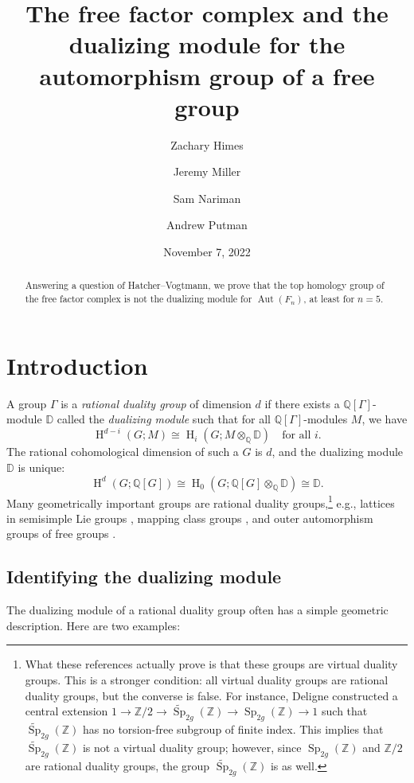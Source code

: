 \documentclass[11pt]{amsart}
\title[Free factors and dualizing modules]{The free factor complex and the dualizing module for the automorphism group of a free group}
\author{Zachary Himes}
\author{Jeremy Miller}
\author{Sam Nariman}
\author{Andrew Putman}
\date{November 7, 2022}
\numberwithin{equation}{section}
\theoremstyle{plain}
\theoremstyle{definition}
\theoremstyle{remark}
\DeclareMathOperator{\Sp}{Sp}
\newcommand\Z{\ensuremath{\mathbb{Z}}}
\newcommand\Q{\ensuremath{\mathbb{Q}}}
\DeclareMathOperator{\HH}{H}
\DeclareMathOperator{\Aut}{Aut}
\newcommand\bbD{\ensuremath{\mathbb{D}}}
\begin{document}
\newpage

\begin{abstract}
Answering a question of Hatcher--Vogtmann, we prove that the top homology group of the free factor complex is not the dualizing module
for $\Aut(F_n)$, at least for $n = 5$.
\end{abstract}

\maketitle

\section{Introduction}
\label{section:introduction}

A group $\Gamma$ is a {\em rational duality group} of dimension $d$ if there exists a $\Q[\Gamma]$-module $\bbD$ called the
{\em dualizing module} such that for all $\Q[\Gamma]$-modules $M$, we have
\[\HH^{d-i}(G;M) \cong \HH_{i}(G;M \otimes_{\Q} \bbD) \quad \text{for all $i$}.\]
The rational cohomological dimension of such a $G$ is $d$, and the dualizing module $\bbD$ is unique:
\[\HH^d(G;\Q[G]) \cong \HH_0(G;\Q[G] \otimes_{\Q} \bbD) \cong \bbD.\]
Many geometrically important groups are rational duality groups,\footnote{What these references actually prove
is that these groups are virtual duality groups.  This is a stronger condition: all virtual duality groups
are rational duality groups, but the converse is false.  For instance, Deligne \cite{DeligneRF} constructed a
central extension $1 \rightarrow \mathbb{Z}/2 \rightarrow \widetilde{\Sp}_{2g}(\Z) \rightarrow \Sp_{2g}(\Z) \rightarrow 1$
such that $\widetilde{\Sp}_{2g}(\Z)$ has no torsion-free subgroup of finite index.  This implies that
$\widetilde{\Sp}_{2g}(\Z)$ is not a virtual duality group; however, since $\Sp_{2g}(\Z)$ and $\Z/2$ are rational
duality groups, the group $\widetilde{\Sp}_{2g}(\Z)$ is as well.}
e.g., lattices in semisimple Lie groups \cite{BorelSerre},
mapping class groups \cite{HarerDuality}, and outer automorphism groups of free groups \cite{BestvinaFeighnDuality}.

\subsection{Identifying the dualizing module}
The dualizing module of a rational duality group often has a simple geometric description.  Here are two examples:
\end{document}
